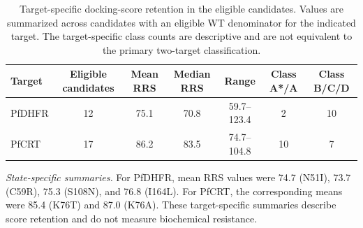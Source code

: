 \begin{table}[htbp]
\centering
\scriptsize
\caption{Target-specific docking-score retention in the eligible candidates. Values are summarized across candidates with an eligible WT denominator for the indicated target. The target-specific class counts are descriptive and are not equivalent to the primary two-target classification.}
\label{tab:s12_rrs_by_target}
\begin{tabular}{l c c c c c c}
\toprule
Target & Eligible candidates & Mean RRS & Median RRS & Range & Class A*/A & Class B/C/D \\
\midrule
PfDHFR & 12 & 75.1 & 70.8 & 59.7--123.4 & 2 & 10 \\
PfCRT & 17 & 86.2 & 83.5 & 74.7--104.8 & 10 & 7 \\
\bottomrule
\end{tabular}
\end{table}

\noindent\textit{State-specific summaries.} For PfDHFR, mean RRS values were 74.7 (N51I), 73.7 (C59R), 75.3 (S108N), and 76.8 (I164L). For PfCRT, the corresponding means were 85.4 (K76T) and 87.0 (K76A). These target-specific summaries describe score retention and do not measure biochemical resistance.
